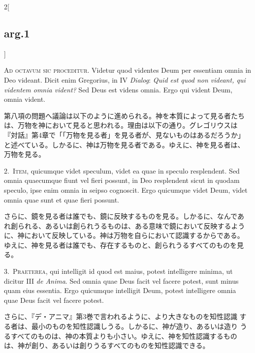 \documentclass[paper=a4paper,fontsize=10pt,jafontsize=9pt,titlepage]{jlreq}
\begin{document}
{}
\setcounter{section}{8}
\setcounter{subsection}{0}

\begin{paracol}{2}[\subsection{arg.1}]

{\scshape Ad octavum sic proceditur}. Videtur quod videntes Deum per
essentiam omnia in Deo videant. Dicit enim Gregorius, in IV {\itshape
Dialog}: {\itshape Quid est quod non videant, qui videntem omnia vident?}
Sed Deus est videns omnia. Ergo qui vident Deum, omnia vident.

\switchcolumn

第八項の問題へ議論は以下のように進められる。神を本質によって見る者たち
は、万物を神において見ると思われる。理由は以下の通り。グレゴリウスは
『対話』第4章で「「万物を見る者」を見る者が、見ないものはあるだろうか」
と述べている。しかるに、神は万物を見る者である。ゆえに、神を見る者は、
万物を見る。

\switchcolumn*

2.~{\scshape Item}, quicumque videt speculum, videt ea quae in speculo
resplendent. Sed omnia quaecumque fiunt vel fieri possunt, in Deo
resplendent sicut in quodam speculo, ipse enim omnia in seipso
cognoscit. Ergo quicumque videt Deum, videt omnia quae sunt et quae
fieri possunt.

\switchcolumn

さらに、鏡を見る者は誰でも、鏡に反映するものを見る。しかるに、なんであ
れ創られる、あるいは創られうるものは、ある意味で鏡において反映するよう
に、神において反映している。神は万物を自らにおいて認識するからである。
ゆえに、神を見る者は誰でも、存在するものと、創られうるすべてのものを見
る。


3.~{\scshape Praeterea}, qui intelligit id quod est maius, potest
intelligere minima, ut dicitur III {\itshape de Anima}. Sed omnia quae Deus
facit vel facere potest, sunt minus quam eius essentia. Ergo quicumque
intelligit Deum, potest intelligere omnia quae Deus facit vel facere
potest.

\switchcolumn

さらに、『デ・アニマ』第3巻で言われるように、より大きなものを知性認識
する者は、最小のものを知性認識しうる。しかるに、神が造り、あるいは造り
うるすべてのものは、神の本質よりも小さい。ゆえに、神を知性認識するもの
は、神が創り、あるいは創りうるすべてのものを知性認識できる。


\end{paracol}
\end{document}
